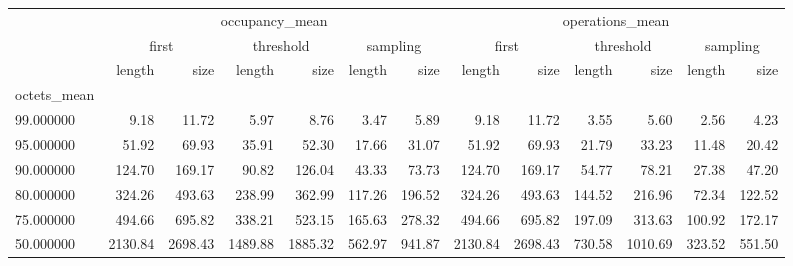 \begin{tabular}{lrrrrrrrrrrrr}
\toprule
 & \multicolumn{6}{c}{occupancy_mean} & \multicolumn{6}{c}{operations_mean} \\
 & \multicolumn{2}{c}{first} & \multicolumn{2}{c}{threshold} & \multicolumn{2}{c}{sampling} & \multicolumn{2}{c}{first} & \multicolumn{2}{c}{threshold} & \multicolumn{2}{c}{sampling} \\
 & length & size & length & size & length & size & length & size & length & size & length & size \\
octets_mean &  &  &  &  &  &  &  &  &  &  &  &  \\
\midrule
99.000000 & 9.18 & 11.72 & 5.97 & 8.76 & 3.47 & 5.89 & 9.18 & 11.72 & 3.55 & 5.60 & 2.56 & 4.23 \\
95.000000 & 51.92 & 69.93 & 35.91 & 52.30 & 17.66 & 31.07 & 51.92 & 69.93 & 21.79 & 33.23 & 11.48 & 20.42 \\
90.000000 & 124.70 & 169.17 & 90.82 & 126.04 & 43.33 & 73.73 & 124.70 & 169.17 & 54.77 & 78.21 & 27.38 & 47.20 \\
80.000000 & 324.26 & 493.63 & 238.99 & 362.99 & 117.26 & 196.52 & 324.26 & 493.63 & 144.52 & 216.96 & 72.34 & 122.52 \\
75.000000 & 494.66 & 695.82 & 338.21 & 523.15 & 165.63 & 278.32 & 494.66 & 695.82 & 197.09 & 313.63 & 100.92 & 172.17 \\
50.000000 & 2130.84 & 2698.43 & 1489.88 & 1885.32 & 562.97 & 941.87 & 2130.84 & 2698.43 & 730.58 & 1010.69 & 323.52 & 551.50 \\
\bottomrule
\end{tabular}
